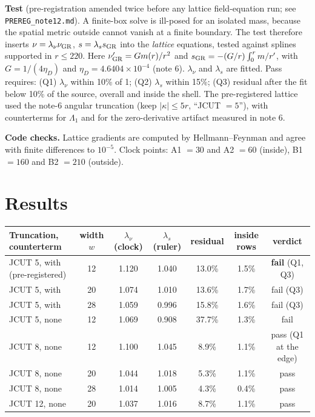 \documentclass[11pt]{article}
\begin{document}
\textbf{Test} (pre-registration amended twice before any lattice field-equation run; see \texttt{PREREG\_note12.md}). A finite-box solve is ill-posed for an isolated mass, because the spatial metric outside cannot vanish at a finite boundary. The test therefore inserts $\nu=\lambda_\nu\nu_{\rm GR}$, $s=\lambda_s s_{\rm GR}$ into the \emph{lattice} equations, tested against splines supported in $r\le220$. Here $\nu_{\rm GR}'=Gm(r)/r^2$ and $s_{\rm GR}=-(G/r)\int_0^r m/r'$, with $G=1/(4\eta_D)$ and $\eta_D=4.6404\times10^{-4}$ (note 6). $\lambda_\nu$ and $\lambda_s$ are fitted. Pass requires: (Q1) $\lambda_\nu$ within 10\% of 1; (Q2) $\lambda_s$ within 15\%; (Q3) residual after the fit below 10\% of the source, overall and inside the shell. The pre-registered lattice used the note-6 angular truncation (keep $|\kappa|\le5r$, ``JCUT $=5$''), with counterterms for $\Lambda_1$ and for the zero-derivative artifact measured in note 6.

\textbf{Code checks.} Lattice gradients are computed by Hellmann--Feynman and agree with finite differences to $10^{-5}$. Clock points: A1 $=30$ and A2 $=60$ (inside), B1 $=160$ and B2 $=210$ (outside).

\section{Results}
\begin{center}\footnotesize\setlength{\tabcolsep}{4pt}\begin{tabular}{lcccccc}\toprule
Truncation, counterterm & width $w$ & $\lambda_\nu$ (clock) & $\lambda_s$ (ruler) & residual & inside rows & verdict\\\midrule
JCUT 5, with (pre-registered) & 12 & 1.120 & 1.040 & 13.0\% & 1.5\% & \textbf{fail} (Q1, Q3)\\
JCUT 5, with & 20 & 1.074 & 1.010 & 13.6\% & 1.7\% & fail (Q3)\\
JCUT 5, with & 28 & 1.059 & 0.996 & 15.8\% & 1.6\% & fail (Q3)\\
JCUT 5, none & 12 & 1.069 & 0.908 & 37.7\% & 1.3\% & fail\\\midrule
JCUT 8, none & 12 & 1.100 & 1.045 & 8.9\% & 1.1\% & pass (Q1 at the edge)\\
JCUT 8, none & 20 & 1.044 & 1.018 & 5.3\% & 1.1\% & pass\\
JCUT 8, none & 28 & 1.014 & 1.005 & 4.3\% & 0.4\% & pass\\
JCUT 12, none & 20 & 1.037 & 1.016 & 8.7\% & 1.1\% & pass\\\bottomrule
\end{tabular}\end{center}
\end{document}
